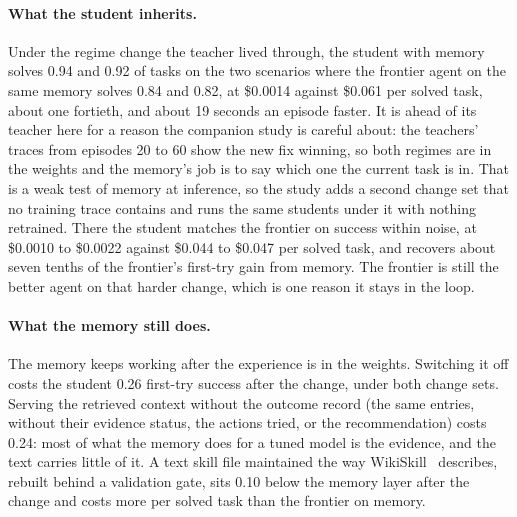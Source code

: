 \documentclass[11pt]{article}
\begin{document}
\paragraph{What the student inherits.} Under the regime change the teacher lived through, the
student with memory solves 0.94 and 0.92 of tasks on the two scenarios where the frontier agent
on the same memory solves 0.84 and 0.82, at \$0.0014 against \$0.061 per solved task, about one
fortieth, and about 19 seconds an episode faster. It is ahead of its teacher here for a reason
the companion study is careful about: the teachers' traces from episodes 20 to 60 show the new
fix winning, so both regimes are in the weights and the memory's job is to say which one the
current task is in. That is a weak test of memory at inference, so the study adds a second
change set that no training trace contains and runs the same students under it with nothing
retrained. There the student matches the frontier on success within noise, at \$0.0010 to
\$0.0022 against \$0.044 to \$0.047 per solved task, and recovers about seven tenths of the
frontier's first-try gain from memory. The frontier is still the better agent on that harder
change, which is one reason it stays in the loop.

\paragraph{What the memory still does.} The memory keeps working after the experience is in the
weights. Switching it off costs the student 0.26 first-try success after the change, under
both change sets. Serving the retrieved context without the outcome record (the same entries,
without their evidence status, the actions tried, or the recommendation) costs 0.24: most of
what the memory does for a tuned model is the evidence, and the text carries little of it. A
text skill file maintained the way WikiSkill~\cite{wikiskill} describes, rebuilt behind a
validation gate, sits 0.10 below the memory layer after the change and costs more per solved
task than the frontier on memory.
\end{document}
